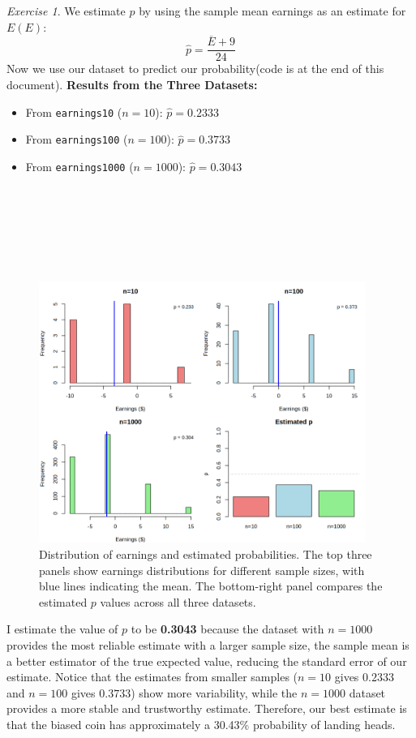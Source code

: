 \documentclass[12pt]{amsart}
\theoremstyle{remark}
\newtheorem*{exercise}{Exercise}%
\theoremstyle{mycomment}
\begin{document}
\begin{exercise}
We estimate $p$ by using the sample mean earnings as an estimate for $E(E)$:
$$\hat{p} = \frac{\overline{E}+ 9}{24}$$
Now we use our dataset to predict our probability(code is at the end of this document).
\textbf{Results from the Three Datasets:}
\begin{itemize}
\item From \texttt{earnings10} ($n=10$): $\hat{p} = 0.2333$
\item From \texttt{earnings100} ($n=100$): $\hat{p} = 0.3733$
\item From \texttt{earnings1000} ($n=1000$): $\hat{p} = 0.3043$ \\ \\ \\ \\ \\ \\ \\ 
\end{itemize}
\begin{figure}[h!]
\centering
\includegraphics[width=0.95\textwidth]{figures/problem2.png}
\caption{Distribution of earnings and estimated probabilities. The top three panels show earnings distributions for different sample sizes, with blue lines indicating the mean. The bottom-right panel compares the estimated $p$ values across all three datasets.}
\label{fig:problem2}
\end{figure} 
\end{exercise}
I estimate the value of $p$ to be \textbf{0.3043} because the dataset with $n=1000$ provides the most reliable estimate with a larger sample size, the sample mean is a better estimator of the true expected value, reducing the standard error of our estimate. Notice that the estimates from smaller samples ($n=10$ gives $0.2333$ and $n=100$ gives $0.3733$) show more variability, while the $n=1000$ dataset provides a more stable and trustworthy estimate. Therefore, our best estimate is that the biased coin has approximately a 30.43\% probability of landing heads.
\end{document}
